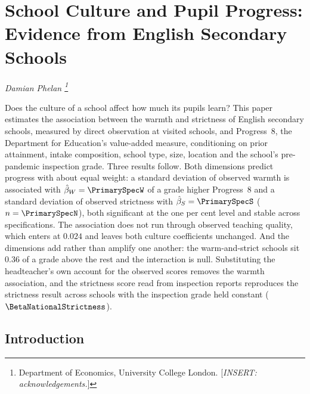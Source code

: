 
\chapter{School Culture and Pupil Progress: Evidence from English Secondary Schools}
\label{ch:paper2}
\resetcounterformats

\begin{center}
  \textit{Damian Phelan%
    \thanks{Department of Economics, University College London.
      [\textit{INSERT: acknowledgements.}]}}
\end{center}

\begin{chapterabstract}
Does the culture of a school affect how much its pupils learn? This paper
estimates the association between the warmth and strictness of English
secondary schools, measured by direct observation at \NTierOne{} visited
schools, and Progress~8, the Department for Education's value-added measure,
conditioning on prior attainment, intake composition, school type, size,
location and the school's pre-pandemic inspection grade. Three results follow.
Both dimensions predict progress with about equal weight: a standard deviation
of observed warmth is associated with $\hat{\beta}_W = \PrimarySpecW$ of a grade
higher Progress~8 and a standard deviation of observed strictness with
$\hat{\beta}_S = \PrimarySpecS$ ($n = \PrimarySpecN$), both significant at the
one per cent level and stable across specifications. The association does not
run through observed teaching quality, which enters at $0.024$ and leaves both
culture coefficients unchanged. And the dimensions add rather than amplify one
another: the warm-and-strict schools sit $0.36$ of a grade above the rest and
the interaction is null. Substituting the headteacher's own account for the
observed scores removes the warmth association, and the strictness score read
from inspection reports reproduces the strictness result across
\NNationalStrictness{} schools with the inspection grade held constant
($\BetaNationalStrictness$).
\end{chapterabstract}

\section{Introduction}
\label{sec:p2_intro}

